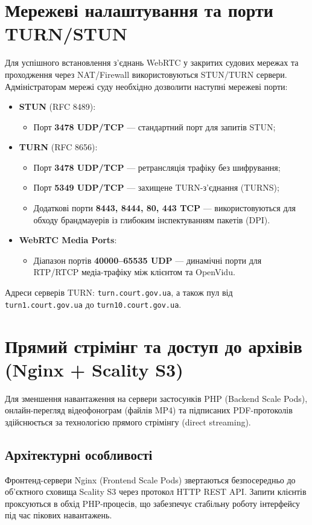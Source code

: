 \documentclass{article}
\begin{document}
\section{Мережеві налаштування та порти TURN/STUN}
Для успішного встановлення з'єднань WebRTC у закритих судових мережах та проходження через NAT/Firewall використовуються STUN/TURN сервери. Адміністраторам мережі суду необхідно дозволити наступні мережеві порти:
\begin{itemize}
    \item \textbf{STUN} (RFC 8489):
    \begin{itemize}
        \item Порт \textbf{3478 UDP/TCP} --- стандартний порт для запитів STUN;
    \end{itemize}
    \item \textbf{TURN} (RFC 8656):
    \begin{itemize}
        \item Порт \textbf{3478 UDP/TCP} --- ретрансляція трафіку без шифрування;
        \item Порт \textbf{5349 UDP/TCP} --- захищене TURN-з'єднання (TURNS);
        \item Додаткові порти \textbf{8443, 8444, 80, 443 TCP} --- використовуються для обходу брандмауерів із глибоким інспектуванням пакетів (DPI).
    \end{itemize}
    \item \textbf{WebRTC Media Ports}:
    \begin{itemize}
        \item Діапазон портів \textbf{40000--65535 UDP} --- динамічні порти для RTP/RTCP медіа-трафіку між клієнтом та OpenVidu.
    \end{itemize}
\end{itemize}

Адреси серверів TURN: \texttt{turn.court.gov.ua}, а також пул від \texttt{turn1.court.gov.ua} до \texttt{turn10.court.gov.ua}.

\section{Прямий стрімінг та доступ до архівів (Nginx + Scality S3)}
Для зменшення навантаження на сервери застосунків PHP (Backend Scale Pods), онлайн-перегляд відеофонограм (файлів MP4) та підписаних PDF-протоколів здійснюється за технологією прямого стрімінгу (direct streaming).

\subsection{Архітектурні особливості}
Фронтенд-сервери Nginx (Frontend Scale Pods) звертаються безпосередньо до об'єктного сховища Scality S3 через протокол HTTP REST API. Запити клієнтів проксуються в обхід PHP-процесів, що забезпечує стабільну роботу інтерфейсу під час пікових навантажень.
\end{document}
